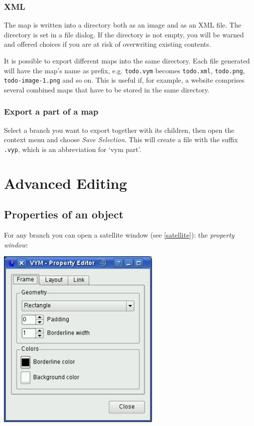 \documentclass[12pt,a4paper]{article}
\begin{document}
\subsubsection*{XML} \label{xmlexport}
The map is written into a directory both as an image and as an XML file. The
directory is set in a file dialog. If the directory is not empty, you
will be warned and offered choices if you are at risk of overwriting existing contents.

It is possible to export different maps into the same directory. Each
file generated will have the map's name as prefix, e.g. {\tt todo.vym}
becomes {\tt todo.xml}, {\tt todo.png}, {\tt todo-image-1.png} and so
on. This is useful if, for example, a website comprises several combined maps that have to be stored in the same directory.

\subsubsection*{Export a part of a map}
Select a branch you want to export together with its children, then open
the context menu and choose {\em Save Selection}. This will create a
file with the suffix {\tt .vyp}, which is an abbreviation for \lq vym
part\rq.


\section{Advanced Editing}

\subsection{Properties of an object} 
For any branch you can open a satellite window (see \ref{satellite}):
the {\em property window}:
\begin{center}
    \includegraphics[width=8cm]{images/propwindow.png}
    \label{propwindow}
\end{center}
\end{document}
